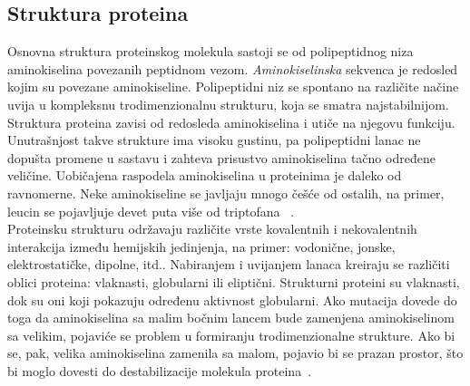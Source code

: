 \subsection{Struktura proteina}
Osnovna struktura proteinskog molekula sastoji se od polipeptidnog niza aminokiselina povezanih peptidnom vezom. \textit{Aminokiselinska} sekvenca je redosled kojim su povezane aminokiseline. Polipeptidni niz se spontano na različite načine uvija  u kompleksnu trodimenzionalnu strukturu, koja se smatra najstabilnijom. Struktura proteina zavisi od redosleda aminokiselina i utiče na njegovu funkciju. Unutrašnjost takve strukture ima visoku gustinu, pa polipeptidni lanac ne dopušta promene u sastavu i zahteva prisustvo aminokiselina tačno određene veličine. Uobičajena raspodela aminokiselina u proteinima je daleko od ravnomerne. Neke aminokiseline se javljaju mnogo češće od ostalih, na primer, leucin se pojavljuje devet puta više od triptofana
~\cite{spasic,Principi,biopathways}. \\

Proteinsku strukturu održavaju različite vrste kovalentnih i nekovalentnih interakcija između hemijskih jedinjenja, na primer: vodonične, jonske, elektrostatičke, dipolne, itd.. Nabiranjem i uvijanjem lanaca kreiraju se različiti oblici proteina: vlaknasti, globularni ili eliptični. Strukturni proteini su vlaknasti, dok su oni koji pokazuju određenu aktivnost globularni. Ako mutacija dovede do toga da aminokiselina sa malim bočnim lancem bude zamenjena aminokiselinom sa velikim, pojaviće se problem u formiranju trodimenzionalne strukture. Ako bi se, pak, velika aminokiselina zamenila sa malom, pojavio bi se prazan prostor, što bi moglo dovesti do destabilizacije molekula proteina~\cite{spasic,Principi,biopathways,medbio}. \\

